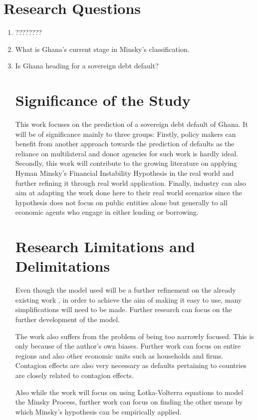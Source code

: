 \documentclass[a4paper, 12pt]{article}
\begin{document}
	\section{Research Questions}
	\begin{enumerate}
		\item ????????
		\item What is Ghana's current stage in Minsky's classification.
		
		\item Is Ghana heading for a sovereign debt default?
		
	\section{Significance of the Study}
	This work focuses on the prediction of a sovereign debt default of Ghana. It will be of significance mainly to three groups: Firstly, policy makers can benefit from another approach towards the prediction of defaults as the reliance on multilateral and donor agencies for such work is hardly ideal. Secondly, this work will contribute to the growing literature on applying Hyman Minsky's Financial Instability Hypothesis in the real world and further refining it through real world application. Finally, industry can also aim at adapting the work done here to their real world scenarios since the hypothesis does not focus on public entities alone but generally to all economic agents who engage in either lending or borrowing.
	
	\section{Research Limitations and Delimitations}
	Even though the model used will be a further refinement on the already existing work \cite{vadasz2007economic,vercelli2009perspective,vercelli2010minsky}, in order to achieve the aim of making it easy to use, many simplifications will need to be made. Further research can focus on the further development of the model.
	
	The work also suffers from the problem of being too narrowly focused. This is only because of the author's own biases. Further work can focus on entire regions and also other economic units such as households and firms. Contagion effects are also very necessary as defaults pertaining to countries are closely related to contagion effects.
	
	Also while the work will focus on using Lotka-Volterra equations to model the Minsky Process, further work can focus on finding the other means by which Minsky's hypothesis can be empirically applied.
	

\end{enumerate}
\end{document}
